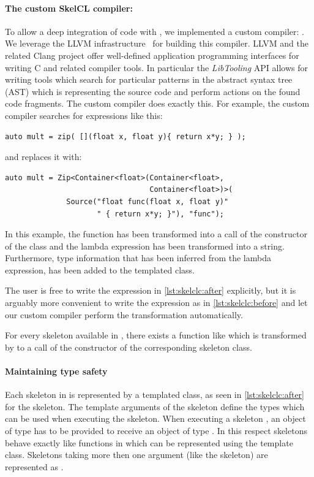 \paragraph{The custom SkelCL compiler: }
To allow a deep integration of \SkelCL code with \Cpp, we implemented a custom compiler: .
We leverage the LLVM infrastructure~\cite{Lattner2004} for building this compiler.
LLVM and the related Clang project offer well-defined application programming interfaces for writing C and \Cpp related compiler tools.
In particular the \emph{LibTooling} API allows for writing tools which search for particular patterns in the abstract syntax tree (AST) which is representing the source code and perform actions on the found code fragments.
The  custom compiler does exactly this.
For example, the custom compiler searches for expressions like this:
\begin{lstlisting}[numbers=none,label={lst:skelclc:before},caption={Code snippet before transformation.}]
auto mult = zip( [](float x, float y){ return x*y; } );
\end{lstlisting}
and replaces it with:
\begin{lstlisting}[numbers=none,label={lst:skelclc:after},caption={Code snippet after transformation.}]
auto mult = Zip<Container<float>(Container<float>,
                                 Container<float>)>(
              Source("float func(float x, float y)"
                     " { return x*y; }"), "func");
\end{lstlisting}

In this example, the  function has been transformed into a call of the constructor of the  class and the lambda expression has been transformed into a string.
Furthermore, type information that has been inferred from the lambda expression, has been added to the templated  class.

The user is free to write the expression in \autoref{lst:skelclc:after} explicitly, but it is arguably more convenient to write the expression as in \autoref{lst:skelclc:before} and let our custom compiler perform the transformation automatically.

For every skeleton available in \SkelCL, there exists a function like  which is transformed by  to a call of the constructor of the corresponding skeleton class.

\paragraph{Maintaining type safety}
Each skeleton in \SkelCL is represented by a templated class, as seen in \autoref{lst:skelclc:after} for the \zip skeleton.
The template arguments of the skeleton define the types which can be used when executing the skeleton.
When executing a skeleton , an object of type  has to be provided to receive an object of type .
In this respect skeletons behave exactly like functions in \Cpp which can be represented using the  template class.
Skeletons taking more then one argument (like the  skeleton) are represented as .%


